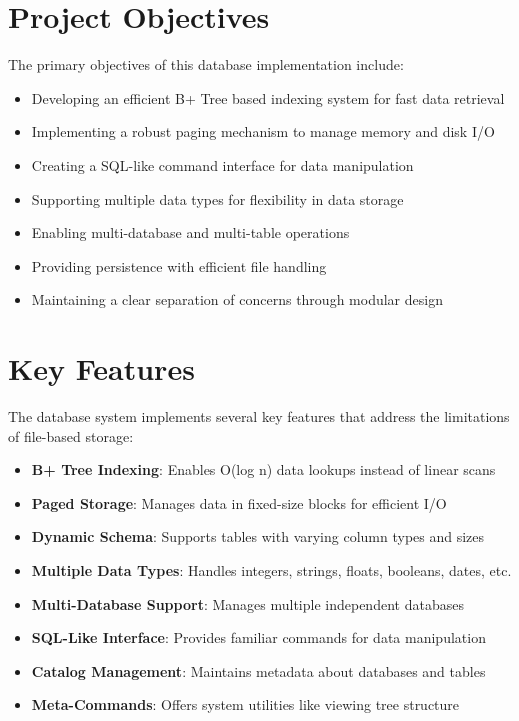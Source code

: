 \documentclass[12pt,a4paper]{article}  %
\begin{document}
\section{Project Objectives}

The primary objectives of this database implementation include:

\begin{itemize}
    \item Developing an efficient B+ Tree based indexing system for fast data retrieval
    \item Implementing a robust paging mechanism to manage memory and disk I/O
    \item Creating a SQL-like command interface for data manipulation
    \item Supporting multiple data types for flexibility in data storage
    \item Enabling multi-database and multi-table operations
    \item Providing persistence with efficient file handling
    \item Maintaining a clear separation of concerns through modular design
\end{itemize}

\section{Key Features}

The database system implements several key features that address the limitations of file-based storage:

\begin{itemize}
    \item \textbf{B+ Tree Indexing}: Enables O(log n) data lookups instead of linear scans
    \item \textbf{Paged Storage}: Manages data in fixed-size blocks for efficient I/O
    \item \textbf{Dynamic Schema}: Supports tables with varying column types and sizes
    \item \textbf{Multiple Data Types}: Handles integers, strings, floats, booleans, dates, etc.
    \item \textbf{Multi-Database Support}: Manages multiple independent databases
    \item \textbf{SQL-Like Interface}: Provides familiar commands for data manipulation
    \item \textbf{Catalog Management}: Maintains metadata about databases and tables
    \item \textbf{Meta-Commands}: Offers system utilities like viewing tree structure
\end{itemize}
\end{document}
